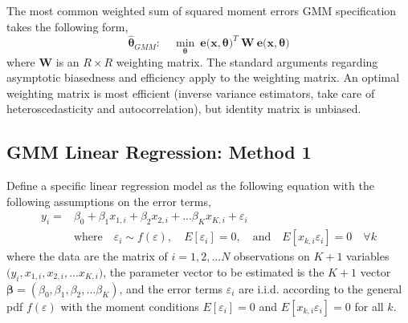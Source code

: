 \documentclass[letterpaper,12pt]{article}
\theoremstyle{definition}
\newcommand\ve{\varepsilon}
\begin{document}
    The most common weighted sum of squared moment errors GMM specification takes the following form,
    \begin{equation}\label{EqGMMdef}
      \bm{\hat{\theta}}_{GMM}:\quad \min_{\bm{\theta}}\:\bm{e}\bigl(\bm{x},\bm{\theta}\bigr)^T\:\bm{W}\:\bm{e}\bigl(\bm{x},\bm{\theta}\bigr)
    \end{equation}
    where $\bm{W}$ is an $R\times R$ weighting matrix. The standard arguments regarding asymptotic biasedness and efficiency apply to the weighting matrix. An optimal weighting matrix is most efficient (inverse variance estimators, take care of heteroscedasticity and autocorrelation), but identity matrix is unbiased.


  \subsection{GMM Linear Regression: Method 1}\label{SecGMM1}

    Define a specific linear regression model as the following equation with the following assumptions on the error terms,
    \begin{equation}\label{EqLinRegGen}
      \begin{split}
        y_i = &\beta_0 + \beta_1 x_{1,i} + \beta_2 x_{2,i} + ... \beta_K x_{K,i} + \ve_i \\
        &\text{where}\quad \ve_i\sim f(\ve), \quad E[\ve_i]=0,\quad\text{and}\quad E[x_{k,i}\ve_i]=0 \quad\forall k
      \end{split}
    \end{equation}
    where the data are the matrix of $i=1,2,...N$ observations on $K + 1$ variables $\bigl(y_i,x_{1,i},x_{2,i},...x_{K,i}\bigr)$, the parameter vector to be estimated is the $K+1$ vector $\bm{\beta}=(\beta_0,\beta_1,\beta_2,...\beta_K)$, and the error terms $\ve_i$ are i.i.d. according to the general pdf $f(\ve)$ with the moment conditions $E[\ve_i]=0$ and $E[x_{k,i}\ve_i]=0$ for all $k$.
\end{document}
